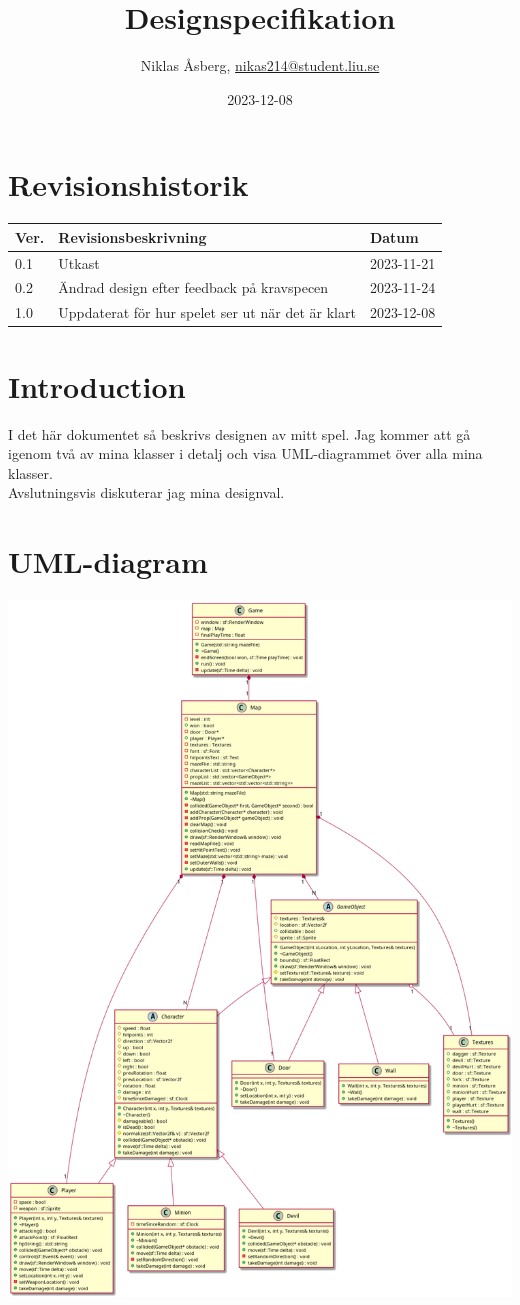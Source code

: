 \documentclass{TDP005mall}
\author{Niklas Åsberg, \url{nikas214@student.liu.se}}
\title{Designspecifikation}
\date{2023-12-08}
\begin{document}
\projectpage
\section{Revisionshistorik}
\begin{table}[!h]
\begin{tabularx}{\linewidth}{|l|X|l|}
\hline
Ver. & Revisionsbeskrivning & Datum \\\hline
0.1 & Utkast & 2023-11-21 \\\hline
0.2 & Ändrad design efter feedback på kravspecen & 2023-11-24 \\\hline
1.0 & Uppdaterat för hur spelet ser ut när det är klart & 2023-12-08 \\\hline
\end{tabularx}
\end{table}

\tableofcontents
\newpage

\section{Introduction}
I det här dokumentet så beskrivs designen av mitt spel. Jag kommer att gå igenom två av mina klasser i detalj och visa UML-diagrammet över alla mina klasser. \\
Avslutningsvis diskuterar jag mina designval.


\section{UML-diagram}
\includegraphics[scale=0.36]{classdia}
\end{document}
